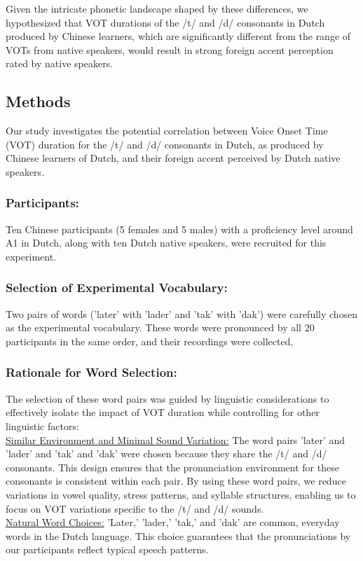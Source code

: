 \documentclass[runningheads]{llncs}
\begin{document}
Given the intricate phonetic landscape shaped by these differences, we hypothesized that VOT durations of the /t/ and /d/ consonants in Dutch produced by Chinese learners, which are significantly different from the range of VOTs from native speakers, would result in strong foreign accent perception rated by native speakers.



%
\subsection*{Methods}
Our study investigates the potential correlation between Voice Onset Time (VOT) duration for the /t/ and /d/ consonants in Dutch, as produced by Chinese learners of Dutch, and their foreign accent perceived by Dutch native speakers. 

\subsubsection*{Participants:}
Ten Chinese participants (5 females and 5 males) with a proficiency level around A1 in Dutch, along with ten Dutch native speakers, were recruited for this experiment. 

\subsubsection*{Selection of Experimental Vocabulary:}
Two pairs of words ('later' with 'lader' and 'tak' with 'dak') were carefully chosen as the experimental vocabulary. These words were pronounced by all 20 participants in the same order, and their recordings were collected.

\subsubsection*{Rationale for Word Selection:}
The selection of these word pairs was guided by linguistic considerations to effectively isolate the impact of VOT duration while controlling for other linguistic factors:\cite{gabriel_vot_2016} \\
\underline{Similar Environment and Minimal Sound Variation:} The word pairs 'later' and 'lader' and 'tak' and 'dak' were chosen because they share the /t/ and /d/ consonants. This design ensures that the pronunciation environment for these consonants is consistent within each pair. By using these word pairs, we reduce variations in vowel quality, stress patterns, and syllable structures, enabling us to focus on VOT variations specific to the /t/ and /d/ sounds.\\
\underline{Natural Word Choices:} 'Later,' 'lader,' 'tak,' and 'dak' are common, everyday words in the Dutch language. This choice guarantees that the pronunciations by our participants reflect typical speech patterns.
\end{document}
